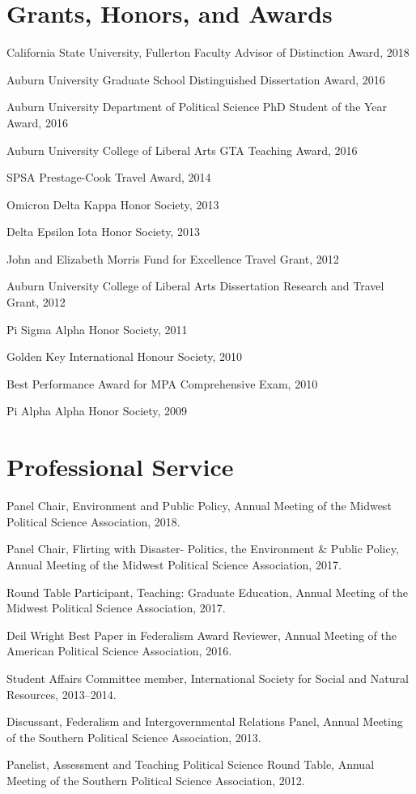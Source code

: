 \documentclass[11pt,letterpaper]{article}
\renewenvironment{itemize}{
  \begin{list}{}{
    \setlength{\leftmargin}{1.5em}
    \setlength{\itemsep}{0.25em}
    \setlength{\parskip}{0pt}
    \setlength{\parsep}{0.25em}
  }
}{
  \end{list}
}
\begin{document}
\section*{Grants, Honors, and Awards}
\begin{itemize}
	\item California State University, Fullerton Faculty Advisor of Distinction Award, 2018
	\item Auburn University Graduate School Distinguished Dissertation Award, 2016
	\item Auburn University Department of Political Science PhD Student of the Year Award, 2016
	\item Auburn University College of Liberal Arts GTA Teaching Award, 2016
	\item SPSA Prestage-Cook Travel Award, 2014
	\item Omicron Delta Kappa Honor Society, 2013
	\item Delta Epsilon Iota Honor Society, 2013
	\item John and Elizabeth Morris Fund for Excellence Travel Grant, 2012
	\item Auburn University College of Liberal Arts Dissertation Research and Travel Grant, 2012
	\item Pi Sigma Alpha Honor Society, 2011
	\item Golden Key International Honour Society, 2010
	\item Best Performance Award for MPA Comprehensive Exam, 2010
	\item Pi Alpha Alpha Honor Society, 2009
\end{itemize}


\section*{Professional Service}
\begin{itemize}\leftmargin=2pt\itemindent=-15pt
	\item Panel Chair, Environment and Public Policy, Annual Meeting of the Midwest Political Science Association, 2018.
	\item Panel Chair, Flirting with Disaster- Politics, the Environment \& Public Policy, Annual Meeting of the Midwest Political Science Association, 2017. 
	\item Round Table Participant, Teaching: Graduate Education, Annual Meeting of the Midwest Political Science Association, 2017.
	\item Deil Wright Best Paper in Federalism Award Reviewer, Annual Meeting of the American Political Science Association, 2016.
	\item Student Affairs Committee member, International Society for Social and Natural Resources, 2013--2014.
	\item Discussant, Federalism and Intergovernmental Relations Panel, Annual Meeting of the Southern Political Science Association, 2013.
	\item Panelist, Assessment and Teaching Political Science Round Table, Annual Meeting of the Southern Political Science Association, 2012.
\end{itemize}
\end{document}
